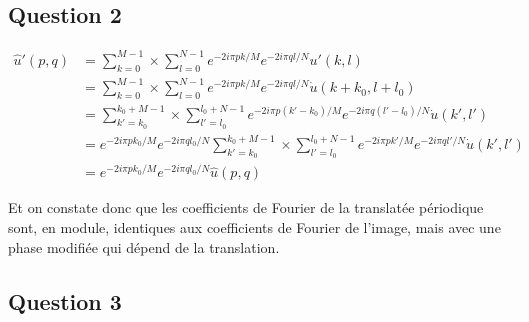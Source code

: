 \documentclass[12pt,a4paper,onecolumn]{article}
\begin{document}
\subsection{Question 2}

\begin{equation}
	\begin{split}
		\widehat{u}'(p, q) &= \sum_{k = 0}^{M - 1} \times \sum_{l = 0}^{N - 1}e^{-2i\pi pk/M}e^{-2i\pi ql/N}u'(k, l) \\
		&= \sum_{k = 0}^{M - 1} \times \sum_{l = 0}^{N - 1}e^{-2i\pi pk/M}e^{-2i\pi ql/N}\dot{u}(k + k_0, l + l_0)\\
		&= \sum_{k' = k_0}^{k_0 + M - 1} \times \sum_{l' = l_0}^{l_0 + N - 1}e^{-2i\pi p(k' - k_0)/M}e^{-2i\pi q(l'-l_0)/N}\dot{u}(k', l') \\
		&= e^{-2i\pi pk_0/M}e^{-2i\pi ql_0/N}\sum_{k' = k_0}^{k_0 + M - 1} \times \sum_{l' = l_0}^{l_0 + N - 1}e^{-2i\pi pk'/M}e^{-2i\pi ql'/N}\dot{u}(k', l') \\
		&= e^{-2i\pi pk_0/M}e^{-2i\pi ql_0/N}\widehat{u}(p, q)
	\end{split}
	\label{eq_8_2}
\end{equation}

Et on constate donc que les coefficients de Fourier de la translatée périodique sont, en module, identiques aux coefficients de Fourier de l'image, mais avec une phase modifiée qui dépend de la translation.

\subsection{Question 3}
\end{document}
